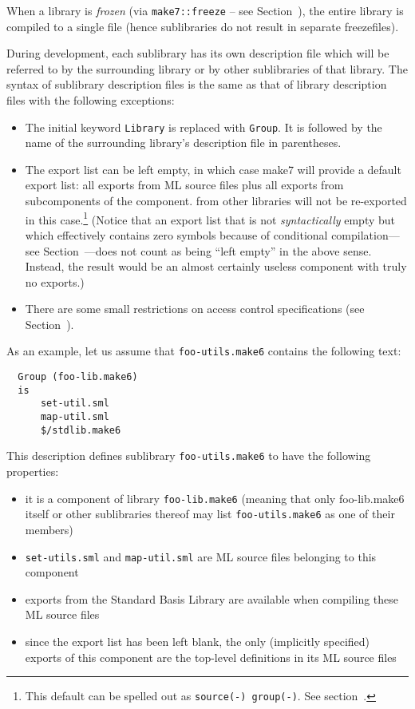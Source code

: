 When a library is {\em frozen} (via {\tt make7::freeze} -- see
Section~), the entire library is compiled to a single
file (hence sublibraries do not result in separate freezefiles).

During development, each sublibrary has its own description file which will
be referred to by the surrounding library or by other sublibraries of that
library. The syntax of sublibrary description files is the same as that of
library description files with the following exceptions:

\begin{itemize}
\item The initial keyword {\tt Library} is replaced with {\tt Group}.
It is followed by the name of the surrounding library's description
file in parentheses.
\item The export list can be left empty, in which case make7 will provide
a default export list: all exports from ML source files plus all
exports from subcomponents of the component. from other libraries will
not be re-exported in this case.\footnote{This default can be spelled
out as {\tt source(-) group(-)}.  See
section~.}  (Notice that an export list that
is not {\em syntactically} empty but which effectively contains zero
symbols because of conditional compilation---see
Section~---does not count as being ``left empty'' in
the above sense.  Instead, the result would be an almost certainly
useless component with truly no exports.)
\item There are some small restrictions on access control
specifications (see Section~).
\end{itemize}

As an example, let us assume that
{\tt foo-utils.make6} contains the following text:

\begin{verbatim}
  Group (foo-lib.make6)
  is
      set-util.sml
      map-util.sml
      $/stdlib.make6
\end{verbatim}

This description defines sublibrary {\tt foo-utils.make6} to have the
following properties:

\begin{itemize}
\item it is a component of library {\tt foo-lib.make6} (meaning that only
foo-lib.make6 itself or other sublibraries thereof may list {\tt foo-utils.make6} as one
of their members)
\item {\tt set-utils.sml} and {\tt map-util.sml} are ML source files
belonging to this component
\item exports from the Standard Basis Library are available when
compiling these ML source files
\item since the export list has been left blank, the only (implicitly
specified) exports of this component are the top-level definitions in
its ML source files
\end{itemize}

